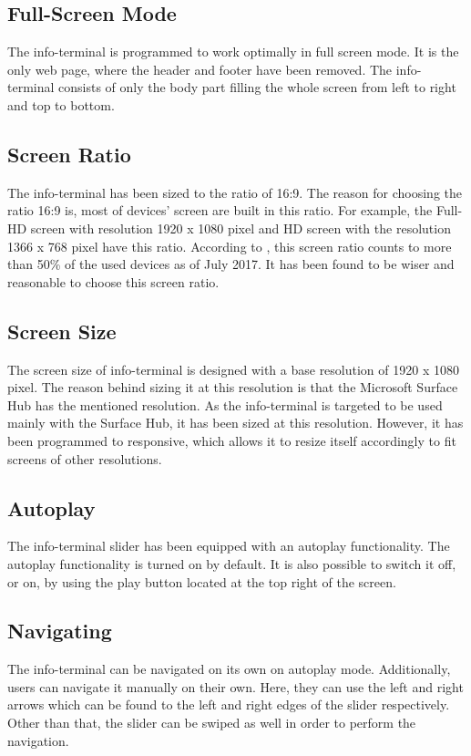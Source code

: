 \subsection*{Full-Screen Mode}
The info-terminal is programmed to work optimally in full screen mode. It is the only web page, where the header and footer have been removed. The info-terminal consists of only the body part filling the whole screen from left to right and top to bottom.

\subsection*{Screen Ratio}
The info-terminal has been sized to the ratio of 16:9. The reason for choosing the ratio 16:9 is, most of devices' screen are built in this ratio. For example, the Full-HD screen with resolution 1920 x 1080 pixel and HD screen with the resolution 1366 x 768 pixel have this ratio. According to \cite{screen-stat}, this screen ratio counts to more than 50\% of the used devices as of July 2017. It has been found to be wiser and reasonable to choose this screen ratio.

\subsection*{Screen Size}
The screen size of info-terminal is designed with a base resolution of 1920 x 1080 pixel. The reason behind sizing it at this resolution is that the Microsoft Surface Hub has the mentioned resolution. As the info-terminal is targeted to be used mainly with the Surface Hub, it has been sized at this resolution. However, it has been programmed to responsive, which allows it to resize itself accordingly to fit screens of other resolutions.

\subsection*{Autoplay}
The info-terminal slider has been equipped with an autoplay functionality. The autoplay functionality is turned on by default. It is also possible to switch it off, or on, by using the play button located at the top right of the screen.

\subsection*{Navigating}
The info-terminal can be navigated on its own on autoplay mode. Additionally, users can navigate it manually on their own. Here, they can use the left and right arrows which can be found to the left and right edges of the slider respectively. Other than that, the slider can be swiped as well in order to perform the navigation.

